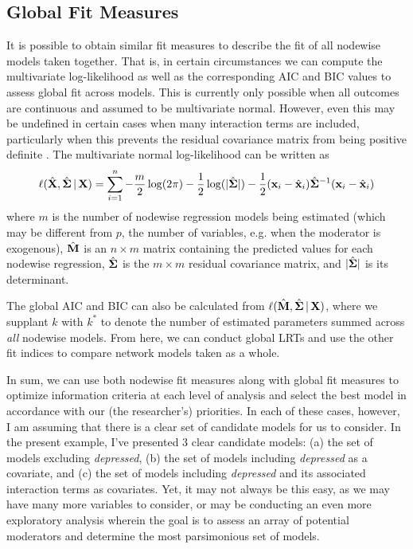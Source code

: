 \subsection{Global Fit Measures}
It is possible to obtain similar fit measures to describe the fit of all nodewise models taken together. That is, in certain circumstances we can compute the multivariate log-likelihood as well as the corresponding AIC and BIC values to assess global fit across models. This is currently only possible when all outcomes are continuous and assumed to be multivariate normal. However, even this may be undefined in certain cases when many interaction terms are included, particularly when this prevents the residual covariance matrix from being positive definite \cite{yang2014mixed,haslbeck2018moderated}. The multivariate normal log-likelihood can be written as
\begin{equation}
    \ell(\hat{\mathbf{X}}, \hat{\bm{\Sigma}}\,|\,\mathbf{X}) = \sum_{i=1}^n -\frac{m}{2}\log(2\pi) - \frac{1}{2}\log(|\hat{\bm{\Sigma}}|) - \frac{1}{2}(\mathbf{x}_i - \hat{\mathbf{x}}_i)\hat{\bm{\Sigma}}^{-1}(\mathbf{x}_i - \hat{\mathbf{x}}_i)
\end{equation}
where $m$ is the number of nodewise regression models being estimated (which may be different from $p$, the number of variables, e.g. when the moderator is exogenous), $\hat{\mathbf{M}}$ is an $n \times m$ matrix containing the predicted values for each nodewise regression, $\hat{\bm{\Sigma}}$ is the $m \times m$ residual covariance matrix, and $|\hat{\bm{\Sigma}}|$ is its determinant.

The global AIC and BIC can also be calculated from $\ell(\hat{\mathbf{M}}, \hat{\bm{\Sigma}}\,|\,\mathbf{X})$, where we supplant $k$ with $k^*$ to denote the number of estimated parameters summed across \textit{all} nodewise models. From here, we can conduct global LRTs and use the other fit indices to compare network models taken as a whole.

In sum, we can use both nodewise fit measures along with global fit measures to optimize information criteria at each level of analysis and select the best model in accordance with our (the researcher's) priorities. In each of these cases, however, I am assuming that there is a clear set of candidate models for us to consider. In the present example, I've presented $3$ clear candidate models: (a) the set of models excluding \textit{depressed}, (b) the set of models including \textit{depressed} as a covariate, and (c) the set of models including \textit{depressed} and its associated interaction terms as covariates. Yet, it may not always be this easy, as we may have many more variables to consider, or may be conducting an even more exploratory analysis wherein the goal is to assess an array of potential moderators and determine the most parsimonious set of models.

